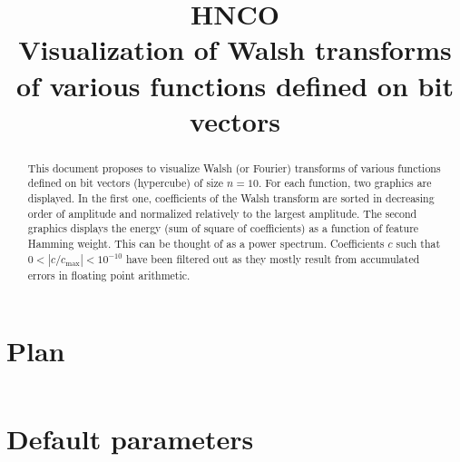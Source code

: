 \documentclass[a4paper]{article}
\begin{document}

\title{HNCO\\
  Visualization of Walsh transforms\\
  of various functions defined on bit vectors}
\maketitle

\begin{abstract}
  This document proposes to visualize Walsh (or Fourier) transforms of
  various functions defined on bit vectors (hypercube) of size
  $n=10$. For each function, two graphics are displayed. In the first
  one, coefficients of the Walsh transform are sorted in decreasing
  order of amplitude and normalized relatively to the largest
  amplitude. The second graphics displays the energy (sum of square of
  coefficients) as a function of feature Hamming weight. This can be
  thought of as a power spectrum. Coefficients $c$ such that
  $0 < |c/c_{\max}| < 10^{-10}$ have been filtered out as they mostly
  result from accumulated errors in floating point arithmetic.
\end{abstract}

\tableofcontents



\appendix

\section{Plan}

\inputminted[breaklines=true]{json}{../plan-compact.json}

\section{Default parameters}

\inputminted[breaklines=true]{text}{../log.defaults}
\end{document}
